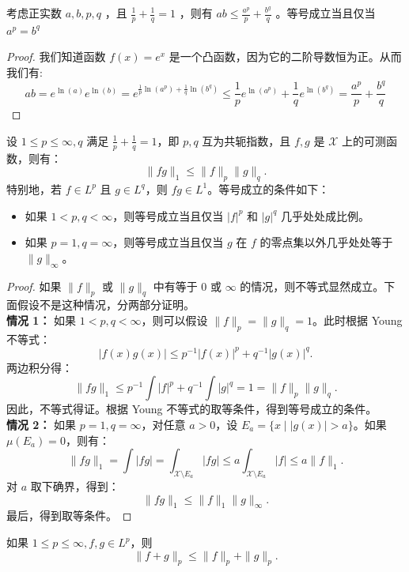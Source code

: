 \documentclass[lang=cn,newtx,10pt,scheme=chinese,thmcnt=chapter]{elegantbook}
\begin{document}
\begin{lemma}[Young不等式]
考虑正实数 $a, b, p, q$ ，且 $\frac{1}{p}+\frac{1}{q}=1$ ，则有 $a b \leqslant \frac{a^p}{p}+\frac{b^q}{q}$ 。等号成立当且仅当 $a^p=b^q$
\end{lemma}
\begin{proof}
我们知道函数 $f(x)=e^x$ 是一个凸函数，因为它的二阶导数恒为正。从而我们有:
\begin{equation*}
a b=e^{\ln (a)} e^{\ln (b)}=e^{\frac{1}{p} \ln \left(a^p\right)+\frac{1}{q} \ln \left(b^q\right)} \leqslant \frac{1}{p} e^{\ln \left(a^p\right)}+\frac{1}{q} e^{\ln \left(b^q\right)}=\frac{a^p}{p}+\frac{b^q}{q}
\end{equation*}
\end{proof}
\begin{theorem}
设 $1 \leqslant p \leqslant \infty, q$ 满足 $ \frac{1}{p} + \frac{1}{q} = 1$，即 $p, q$ 互为共轭指数，且 $f, g$ 是 $\mathscr{X}$ 上的可测函数，则有：
\[
\| f g \|_1 \leqslant \| f \|_p \| g \|_q.
\]
特别地，若 $f \in L^p$ 且 $g \in L^q$，则 $f g \in L^1$。等号成立的条件如下：
\begin{itemize}
    \item 如果 $1 < p, q < \infty$，则等号成立当且仅当 $|f|^p$ 和 $|g|^q$ 几乎处处成比例。
    \item 如果 $p = 1, q = \infty$，则等号成立当且仅当 $g$ 在 $f$ 的零点集以外几乎处处等于 $\| g \|_{\infty}$。
\end{itemize}
\end{theorem}

\begin{proof}
如果 $\| f \|_p$ 或 $\| g \|_q$ 中有等于 $0$ 或 $\infty$ 的情况，则不等式显然成立。下面假设不是这种情况，分两部分证明。\\
\textbf{情况 1：} 如果 $1 < p, q < \infty$，则可以假设 $\| f \|_p = \| g \|_q = 1$。此时根据 Young 不等式：
\[
|f(x) g(x)| \leqslant p^{-1} |f(x)|^p + q^{-1} |g(x)|^q.
\]
两边积分得：
\[
\| f g \|_1 \leqslant p^{-1} \int |f|^p + q^{-1} \int |g|^q = 1 = \| f \|_p \| g \|_q.
\]
因此，不等式得证。根据 Young 不等式的取等条件，得到等号成立的条件。\\
\textbf{情况 2：} 如果 $p = 1, q = \infty$，对任意 $a > 0$，设 $E_a = \{x \mid |g(x)| > a\}$。如果 $\mu(E_a) = 0$，则有：
\[
\| f g \|_1 = \int |f g| = \int_{\mathscr{X} \setminus E_a} |f g| \leqslant a \int_{\mathscr{X} \setminus E_a} |f| \leqslant a \| f \|_1.
\]
对 $a$ 取下确界，得到：
\[
\| f g \|_1 \leqslant \| f \|_1 \| g \|_{\infty}.
\]
最后，得到取等条件。
\end{proof}
\begin{theorem}
如果 $1 \leqslant p \leqslant \infty, f, g \in L^p$，则
\[
\|f + g\|_p \leqslant \|f\|_p + \|g\|_p.
\]
\end{theorem}
\end{document}
